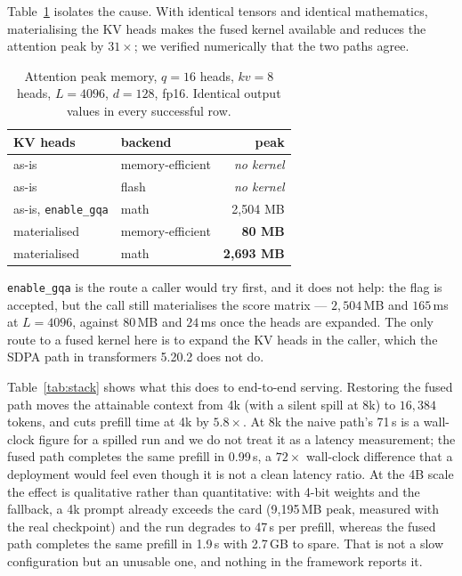 \documentclass[10pt,journal]{IEEEtran}
\begin{document}
Table~\ref{tab:gqa} isolates the cause. With identical tensors and identical
mathematics, materialising the KV heads makes the fused kernel available and
reduces the attention peak by $31\times$; we verified numerically that the two
paths agree.

\begin{table}[t]
\centering
\caption{Attention peak memory, $q{=}16$ heads, $kv{=}8$ heads, $L{=}4096$,
$d{=}128$, fp16. Identical output values in every successful row.}
\label{tab:gqa}
\begin{tabular}{llr}
\toprule
KV heads & backend & peak \\
\midrule
as-is & memory-efficient & \emph{no kernel} \\
as-is & flash & \emph{no kernel} \\
as-is, \texttt{enable\_gqa} & math & 2{,}504 MB \\
materialised & memory-efficient & \textbf{80 MB} \\
materialised & math & \textbf{2{,}693 MB} \\
\bottomrule
\end{tabular}
\end{table}

\texttt{enable\_gqa} is the route a caller would try first, and it does not
help: the flag is accepted, but the call still materialises the score matrix ---
$2{,}504$\,MB and $165$\,ms at $L{=}4096$, against $80$\,MB and $24$\,ms once the
heads are expanded. The only route to a fused kernel here is to expand the KV
heads in the caller, which the SDPA path in transformers 5.20.2 does not do.

Table~\ref{tab:stack} shows what this does to end-to-end serving. Restoring the
fused path moves the attainable context from 4k (with a silent spill at 8k) to
$16{,}384$ tokens, and cuts prefill time at 4k by $5.8\times$. At 8k the naive path's
71\,s is a wall-clock figure for a spilled run and we do not treat it as a
latency measurement; the fused path completes the same prefill in 0.99\,s, a
$72\times$ wall-clock difference that a deployment would feel even though it is
not a clean latency ratio. At the 4B scale the effect is qualitative rather than
quantitative: with 4-bit weights and the fallback, a 4k prompt already exceeds
the card (9{,}195\,MB peak, measured with the real checkpoint) and the run
degrades to 47\,s per prefill, whereas the fused path completes the same prefill
in 1.9\,s with 2.7\,GB to spare. That
is not a slow configuration but an unusable one, and nothing in the framework
reports it.
\end{document}

